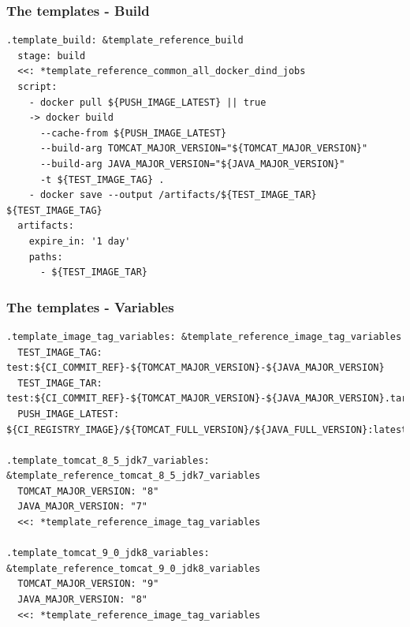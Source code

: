 \documentclass[14pt,aspectratio=169]{beamer}
\begin{document}
\begin{frame}[fragile]
  \frametitle{The templates - Build}
  \begin{verbatim}
.template_build: &template_reference_build
  stage: build
  <<: *template_reference_common_all_docker_dind_jobs
  script:
    - docker pull ${PUSH_IMAGE_LATEST} || true
    -> docker build
      --cache-from ${PUSH_IMAGE_LATEST}
      --build-arg TOMCAT_MAJOR_VERSION="${TOMCAT_MAJOR_VERSION}"
      --build-arg JAVA_MAJOR_VERSION="${JAVA_MAJOR_VERSION}"
      -t ${TEST_IMAGE_TAG} .
    - docker save --output /artifacts/${TEST_IMAGE_TAR} ${TEST_IMAGE_TAG}
  artifacts:
    expire_in: '1 day'
    paths:
      - ${TEST_IMAGE_TAR}
  \end{verbatim}
\end{frame}

\begin{frame}[fragile]
  \frametitle{The templates - Variables}
  \begin{verbatim}
.template_image_tag_variables: &template_reference_image_tag_variables
  TEST_IMAGE_TAG: test:${CI_COMMIT_REF}-${TOMCAT_MAJOR_VERSION}-${JAVA_MAJOR_VERSION}
  TEST_IMAGE_TAR: test:${CI_COMMIT_REF}-${TOMCAT_MAJOR_VERSION}-${JAVA_MAJOR_VERSION}.tar
  PUSH_IMAGE_LATEST: ${CI_REGISTRY_IMAGE}/${TOMCAT_FULL_VERSION}/${JAVA_FULL_VERSION}:latest

.template_tomcat_8_5_jdk7_variables: &template_reference_tomcat_8_5_jdk7_variables
  TOMCAT_MAJOR_VERSION: "8"
  JAVA_MAJOR_VERSION: "7"
  <<: *template_reference_image_tag_variables

.template_tomcat_9_0_jdk8_variables: &template_reference_tomcat_9_0_jdk8_variables
  TOMCAT_MAJOR_VERSION: "9"
  JAVA_MAJOR_VERSION: "8"
  <<: *template_reference_image_tag_variables
  \end{verbatim}
\end{frame}
\end{document}
